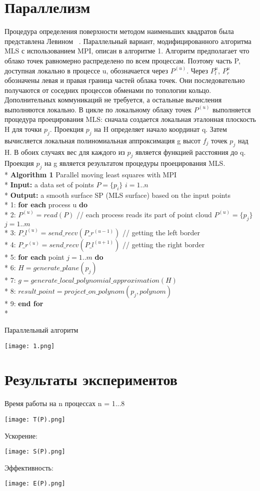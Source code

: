\section{Параллелизм}

Процедура определения поверхности методом наименьших квадратов была представлена Левином ~\cite{LEVIN}. Параллельный вариант, модифицированного алгоритма MLS с использованием MPI, описан в алгоритме 1. Алгоритм предполагает что облако точек равномерно распределено по всем процессам. Поэтому часть P, доступная локально в процессе u, обозначается через $P^{(u)}$. Через $P_l^{u}$, $P_r^{u}$ обозначены левая и правая граница частей облака точек. Они последовательно получаются от соседних процессов обменами по топологии кольцо. Дополнительных коммуникаций не требуется, а остальные вычисления выполняются локально. В цикле по локальному облаку точек $P^{(u)}$ выполняется процедура проецирования MLS: сначала создается локальная эталонная плоскость H для точки $p_j$. Проекция $p_j$ на H определяет начало координат q. Затем вычисляется локальная полиномиальная аппроксимация g высот $f_j$ точек $p_j$ над H. В обоих случаях вес для каждого из $p_j$ является функцией расстояния до q. Проекция $p_j$ на g является результатом процедуры проецирования MLS. \\*
\textbf{Algorithm 1}  Parallel moving least squares with MPI \\*
\textbf{Input:} a data set of points $P = \{p_i\}$ $i = 1..n$ \\*
\textbf{Output:} a smooth surface SP (MLS surface) based on the input
points \\*
1: \textbf{for each} process u \textbf{do} \\*
2: \quad $P^{(u)} = read(P)$ // each process reads its part of point cloud $P^{(u)} = \{p_j\}$ $j = 1..m$ \\*
3: \quad $P\_l^{(u)} = send\_recv(P\_r^{(u-1)})$ // getting the left border\\* 
4: \quad $P\_r^{(u)} = send\_recv(P\_l^{(u+1)})$ // getting the right border\\*
5: \quad\textbf{for each} point $j = 1..m $ \textbf{do}\\*
6: \quad\quad$H = generate\_plane(p_j)$ \\*
7: \quad\quad$g = generate\_local\_polynomial\_approximation(H)$ \\*
8: \quad\quad$result\_point = project\_on\_polynom(p_j, polynom)$ \\*
9: \quad\textbf{end for} \\*




Параллельный алгоритм

\texttt{[image: 1.png]}

\section{Результаты экспериментов}

Время работы на n процессах n = 1...8


\texttt{[image: T(P).png]}

Ускорение:

\texttt{[image: S(P).png]}

Эффективность:

\texttt{[image: E(P).png]}

